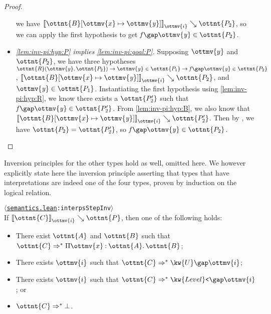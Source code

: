 \documentclass[a4paper,UKenglish,cleveref,autoref,thm-restate]{lipics-v2021}
\newcommand{\repo}{https://github.com/ionathanch/TTBFL}
\newcommand{\thmref}[2]{%
  $\langle$\href{\repo/tree/main/src/#1}{\texttt{#1}}\texttt{:#2}$\rangle$%
}
\begin{document}
\begin{proof}
\begin{itemize}[topsep=0pt]
      we have $ \mathopen{\llbracket}   \ottnt{B} [  \ottmv{x}  \mapsto   \mathit{ \ottmv{y} }   ]   \mathclose{\rrbracket}_{ \ottmv{i} } \searrow  \ottnt{P_{{\mathrm{2}}}} $,
      so we can apply the first hypothesis to get $   \mathit{ f }   \gap   \mathit{ \ottmv{y} }    \in  \ottnt{P_{{\mathrm{2}}}} $.
    \item \textit{\ref{lem:inv-pi:hyp:P} implies \ref{lem:inv-pi:goal:P}.}
      Supposing $\ottmv{y}$ and $\ottnt{P_{{\mathrm{2}}}}$,
      we have three hypotheses $  \ottnt{R} ( \ottmv{y} ,  \ottnt{P_{{\mathrm{2}}}} )   \to     \mathit{ \ottmv{y} }   \in  \ottnt{P_{{\mathrm{1}}}}   \to     \mathit{ f }   \gap   \mathit{ \ottmv{y} }    \in  \ottnt{P_{{\mathrm{2}}}}   $,
      $ \mathopen{\llbracket}   \ottnt{B} [  \ottmv{x}  \mapsto   \mathit{ \ottmv{y} }   ]   \mathclose{\rrbracket}_{ \ottmv{i} } \searrow  \ottnt{P_{{\mathrm{2}}}} $, and $  \mathit{ \ottmv{y} }   \in  \ottnt{P_{{\mathrm{1}}}} $.
      Instantiating the first hypothesis using \ref{lem:inv-pi:hyp:R},
      we know there exists a $\ottnt{P'_{{\mathrm{2}}}}$ such that $   \mathit{ f }   \gap   \mathit{ \ottmv{y} }    \in  \ottnt{P'_{{\mathrm{2}}}} $.
      From \ref{lem:inv-pi:hyp:B}, we also know that $ \mathopen{\llbracket}   \ottnt{B} [  \ottmv{x}  \mapsto   \mathit{ \ottmv{y} }   ]   \mathclose{\rrbracket}_{ \ottmv{i} } \searrow  \ottnt{P'_{{\mathrm{2}}}} $.
      Then by , we have $\ottnt{P_{{\mathrm{2}}}} = \ottnt{P'_{{\mathrm{2}}}}$, so $   \mathit{ f }   \gap   \mathit{ \ottmv{y} }    \in  \ottnt{P_{{\mathrm{2}}}} $.
      \qedhere
  \end{itemize}
\end{proof}

Inversion principles for the other types hold as well, omitted here.
We however explicitly state here the inversion principle
asserting that types that have interpretations are indeed one of the four types,
proven by induction on the logical relation.

\begin{lemma}[Inversion (l.r.)] \thmref{semantics.lean}{interpsStepInv} \label{lem:lr:inv} \\
  If $ \mathopen{\llbracket}  \ottnt{C}  \mathclose{\rrbracket}_{ \ottmv{i} } \searrow  \ottnt{P} $, then one of the following holds:
  \begin{itemize}[topsep=0pt]
    \item There exist $\ottnt{A}$ and $\ottnt{B}$ such that $ \ottnt{C}  \Rightarrow^\ast   \Pi  \ottmv{x}  \mathbin{:}  \ottnt{A}  \mathpunct{.}  \ottnt{B}  $;
    \item There exists $\ottmv{i}$ such that $ \ottnt{C}  \Rightarrow^\ast   \kw{U} \gap   \ottmv{i}   $;
    \item There exists $\ottmv{i}$ such that $ \ottnt{C}  \Rightarrow^\ast   \kw{Level}\texttt{<} \gap   \ottmv{i}   $; or
    \item $ \ottnt{C}  \Rightarrow^\ast   \bot  $.
  \end{itemize}
\end{lemma}
\end{document}
